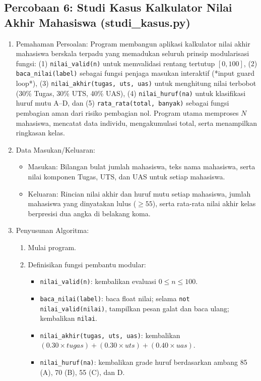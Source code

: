 \documentclass[12pt,a4paper]{article}
\begin{document}
\subsection{Percobaan 6: Studi Kasus Kalkulator Nilai Akhir Mahasiswa (studi\_kasus.py)}
\begin{enumerate}
    \item Pemahaman Persoalan: Program membangun aplikasi kalkulator nilai akhir mahasiswa berskala terpadu yang memadukan seluruh prinsip modularisasi fungsi: (1) \texttt{nilai\_valid(n)} untuk memvalidasi rentang tertutup $[0, 100]$, (2) \texttt{baca\_nilai(label)} sebagai fungsi penjaga masukan interaktif (*input guard loop*), (3) \texttt{nilai\_akhir(tugas, uts, uas)} untuk menghitung nilai terbobot (30\% Tugas, 30\% UTS, 40\% UAS), (4) \texttt{nilai\_huruf(na)} untuk klasifikasi huruf mutu A--D, dan (5) \texttt{rata\_rata(total, banyak)} sebagai fungsi pembagian aman dari risiko pembagian nol. Program utama memproses $N$ mahasiswa, mencatat data individu, mengakumulasi total, serta menampilkan ringkasan kelas.
    \item Data Masukan/Keluaran:
    \begin{itemize}
        \item Masukan: Bilangan bulat jumlah mahasiswa, teks nama mahasiswa, serta nilai komponen Tugas, UTS, dan UAS untuk setiap mahasiswa.
        \item Keluaran: Rincian nilai akhir dan huruf mutu setiap mahasiswa, jumlah mahasiswa yang dinyatakan lulus ($\ge 55$), serta rata-rata nilai akhir kelas berpresisi dua angka di belakang koma.
    \end{itemize}
    \item Penyusunan Algoritma:
    \begin{enumerate}[label=\alph*.]
        \item Mulai program.
        \item Definisikan fungsi pembantu modular:
        \begin{itemize}
            \item \texttt{nilai\_valid(n)}: kembalikan evaluasi $0 \le n \le 100$.
            \item \texttt{baca\_nilai(label)}: baca float nilai; selama \texttt{not nilai\_valid(nilai)}, tampilkan pesan galat dan baca ulang; kembalikan \texttt{nilai}.
            \item \texttt{nilai\_akhir(tugas, uts, uas)}: kembalikan $(0.30 \times tugas) + (0.30 \times uts) + (0.40 \times uas)$.
            \item \texttt{nilai\_huruf(na)}: kembalikan grade huruf berdasarkan ambang 85 (A), 70 (B), 55 (C), dan D.

\end{itemize}
\end{enumerate}
\end{enumerate}
\end{document}
